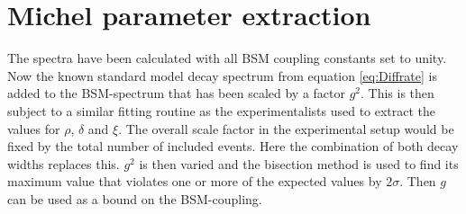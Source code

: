 \section{Michel parameter extraction}
The spectra have been calculated with all BSM coupling constants set to unity. Now the known standard model decay spectrum from equation \ref{eq:Diffrate} is added to the BSM-spectrum that has been scaled by a factor $g^2$. This is then subject to a similar fitting routine as the experimentalists used to extract the values for $\rho$, $\delta$ and $\xi$. The overall scale factor in the experimental setup would be fixed by the total number of included events. Here the combination of both decay widths replaces this.
$g^2$ is then varied and the bisection method is used to find its maximum value that violates one or more of the expected values by $2\sigma$.
Then $g$ can be used as a bound on the BSM-coupling.
